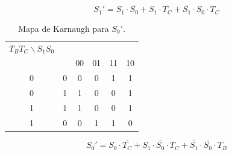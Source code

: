 \documentclass[12pt,onecolumn]{IEEEtran}
\begin{document}
\begin{equation}
S_1' = S_1 \cdot \overline{S_0}
     + S_1 \cdot \overline{T_C}
     + \overline{S_1} \cdot S_0 \cdot T_C
\label{eq:s1_next}
\end{equation}

\begin{table}[H]
\centering
\caption{Mapa de Karnaugh para $S_0'$.}
\label{tab:kmap_s0}
\begin{tabular}{cc|cccc}
\hline
$T_B T_C \backslash S_1 S_0$\\
 & & 00 & 01 & 11 & 10 \\
\hline
0 & 0 & 0 & 0 & 1 & 1 \\
0 & 1 & 1 & 0 & 0 & 1 \\
1 & 1 & 1 & 0 & 0 & 1 \\
1 & 0 & 0 & 1 & 1 & 0 \\
\hline
\end{tabular}
\end{table}

\begin{equation}
S_0' = S_0 \cdot \overline{T_C}
     + S_1 \cdot \overline{S_0} \cdot T_C
     + \overline{S_1} \cdot \overline{S_0} \cdot T_B
\label{eq:s0_next}
\end{equation}
\end{document}
